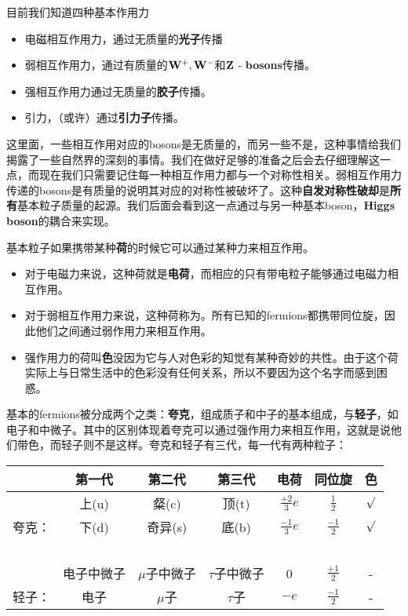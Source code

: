 目前我们知道四种基本作用力

\begin{itemize}
\item 电磁相互作用力，通过无质量的{\bf 光子}传播
\item 弱相互作用力，通过有质量的$\bf W^+, W^-$和$\bf Z$ - {\bf bosons}传播。
\item 强相互作用力通过无质量的{\bf 胶子}传播。
\item 引力，（或许）通过{\bf 引力子}传播。
\end{itemize}

这里面，一些相互作用对应的bosons是无质量的，而另一些不是，这种事情给我们揭露了一些自然界的深刻的事情。我们在做好足够的准备之后会去仔细理解这一点，而现在我们只需要记住每一种相互作用力都与一个对称性相关。弱相互作用力传递的bosons是有质量的说明其对应的对称性被破坏了。这种{\bf 自发对称性破却}是{\bf 所有}基本粒子质量的起源。我们后面会看到这一点通过与另一种基本boson，{\bf Higgs boson}的耦合来实现。

基本粒子如果携带某种{\bf 荷}的时候它可以通过某种力来相互作用。

\begin{itemize}
\item 对于电磁力来说，这种荷就是{\bf 电荷}，而相应的只有带电粒子能够通过电磁力相互作用。
\item 对于弱相互作用力来说，这种荷称为。所有已知的fermions都携带同位旋，因此他们之间通过弱作用力来相互作用。
\item 强作用力的荷叫{\bf 色}没因为它与人对色彩的知觉有某种奇妙的共性。由于这个荷实际上与日常生活中的色彩没有任何关系，所以不要因为这个名字而感到困惑。
\end{itemize}

基本的fermions被分成两个之类：{\bf 夸克}，组成质子和中子的基本组成，与{\bf 轻子}，如电子和中微子。其中的区别体现着夸克可以通过强作用力来相互作用，这就是说他们带色，而轻子则不是这样。夸克和轻子有三代，每一代有两种粒子：

\begin{table}[h]
\centering
\begin{tabular}{c|c|c|c|c|c|c}
 & 第一代 & 第二代 & 第三代 & 电荷 & 同位旋 & 色 \\
 \hline
 & 上(u)  & 粲(c) &  顶(t) & $\tfrac{+2}{3}e$  & $\tfrac{1}{2}$ & $\surd$\\
 夸克： & 下(d) & 奇异(s) &底(b) & $\tfrac{-1}{3}e$ & $\tfrac{-1}{2}$ & $\surd$\\
 \hline
 \ &\ &\ &\ &\ &\ &\ \\
 \hline
 & 电子中微子 & $\mu$子中微子 & $\tau$子中微子 & 0 & $\tfrac{+1}{2}$ & -\\
 轻子：&电子 & $\mu$子 & $\tau$子 & $-e$ & $\tfrac{-1}{2}$ & -\\
 \hline
\end{tabular}
\end{table}

